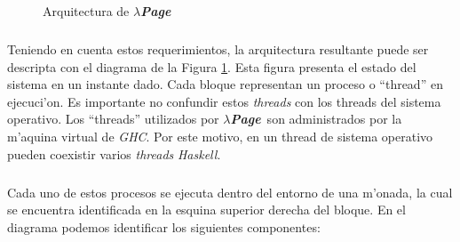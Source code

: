 \documentclass[a4paper]{article}
\newcommand{\haskell}{\textsl{Haskell}}
\newcommand{\hpage}{\textbf{\textsl{$\lambda$Page}}}
\begin{document}
\begin{figure}[hp]
	\begin{center}
		\caption{Arquitectura de \hpage}
		\label{arq1}
	\end{center}
\end{figure}
\subparagraph{}Teniendo en cuenta estos requerimientos, la arquitectura resultante puede ser descripta con el diagrama de la Figura \ref{arq1}.  Esta figura presenta el estado del sistema en un instante dado.  Cada bloque representan un proceso o ``thread'' en ejecuci'on.  Es importante no confundir estos \textsl{threads} con los threads del sistema operativo.  Los ``threads'' utilizados por \hpage\ son administrados por la m'aquina virtual de \textsl{GHC}.  Por este motivo, en un thread de sistema operativo pueden coexistir varios \textsl{threads} \haskell.
\subparagraph{}Cada uno de estos procesos se ejecuta dentro del entorno de una m'onada, la cual se encuentra identificada en la esquina superior derecha del bloque.  En el diagrama podemos identificar los siguientes componentes:
\end{document}
